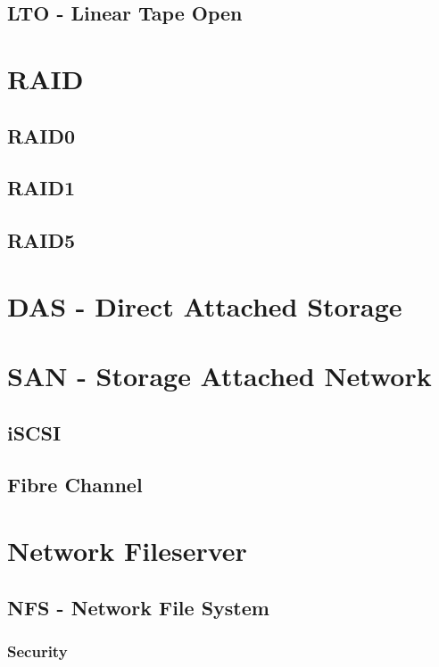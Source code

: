 \documentclass[a4paper,12pt,twoside,openright,titlepage]{book}
\begin{document}
\section{LTO - Linear Tape Open}

\chapter{RAID}

\section{RAID0}

\section{RAID1}

\section{RAID5}


\chapter{DAS - Direct Attached Storage}


\chapter{SAN - Storage Attached Network}

\section{iSCSI}

\section{Fibre Channel}


\chapter{Network Fileserver}

\section{NFS - Network File System}

\subsection{Security}

\end{document}
